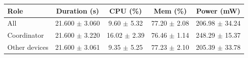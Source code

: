 \begin{tabular}{lcccc}
\hline
\textbf{Role} & \textbf{Duration (s)} & \textbf{CPU (\%)} & \textbf{Mem (\%)} & \textbf{Power (mW)} \\
\hline
All & 21.600 $\pm$ 3.060 & 9.60 $\pm$ 5.32 & 77.20 $\pm$ 2.08 & 206.98 $\pm$ 34.24 \\
Coordinator & 21.600 $\pm$ 3.220 & 16.02 $\pm$ 2.39 & 76.46 $\pm$ 1.14 & 248.29 $\pm$ 15.37 \\
Other devices & 21.600 $\pm$ 3.061 & 9.35 $\pm$ 5.25 & 77.23 $\pm$ 2.10 & 205.39 $\pm$ 33.78 \\
\hline
\end{tabular}
